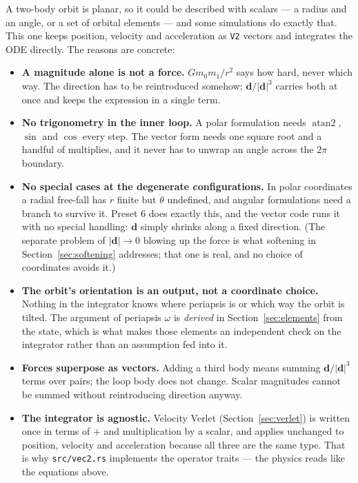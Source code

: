\documentclass[11pt,a4paper]{article}
\newcommand{\vd}{\mathbf{d}}
\begin{document}
A two-body orbit is planar, so it could be described with scalars --- a radius
and an angle, or a set of orbital elements --- and some simulations do exactly
that. This one keeps position, velocity and acceleration as \texttt{V2} vectors
and integrates the ODE directly. The reasons are concrete:

\begin{itemize}\itemsep3pt
  \item \textbf{A magnitude alone is not a force.} $G m_0 m_1 / r^2$ says how
    hard, never which way. The direction has to be reintroduced somehow;
    $\vd/|\vd|^3$ carries both at once and keeps the expression in a single term.
  \item \textbf{No trigonometry in the inner loop.} A polar formulation needs
    $\operatorname{atan2}$, $\sin$ and $\cos$ every step. The vector form needs
    one square root and a handful of multiplies, and it never has to unwrap an
    angle across the $2\pi$ boundary.
  \item \textbf{No special cases at the degenerate configurations.} In polar
    coordinates a radial free-fall has $\dot r$ finite but $\dot\theta$
    undefined, and angular formulations need a branch to survive it. Preset 6
    does exactly this, and the vector code runs it with no special handling:
    $\vd$ simply shrinks along a fixed direction. (The separate problem of
    $|\vd| \to 0$ blowing up the force is what softening in
    Section~\ref{sec:softening} addresses; that one is real, and no choice of
    coordinates avoids it.)
  \item \textbf{The orbit's orientation is an output, not a coordinate choice.}
    Nothing in the integrator knows where periapsis is or which way the orbit is
    tilted. The argument of periapsis $\omega$ is \emph{derived} in
    Section~\ref{sec:elements} from the state, which is what makes those
    elements an independent check on the integrator rather than an assumption
    fed into it.
  \item \textbf{Forces superpose as vectors.} Adding a third body means summing
    $\vd/|\vd|^3$ terms over pairs; the loop body does not change. Scalar
    magnitudes cannot be summed without reintroducing direction anyway.
  \item \textbf{The integrator is agnostic.} Velocity Verlet
    (Section~\ref{sec:verlet}) is written once in terms of $+$ and
    multiplication by a scalar, and applies unchanged to position, velocity and
    acceleration because all three are the same type. That is why
    \texttt{src/vec2.rs} implements the operator traits --- the physics reads
    like the equations above.
\end{itemize}
\end{document}

